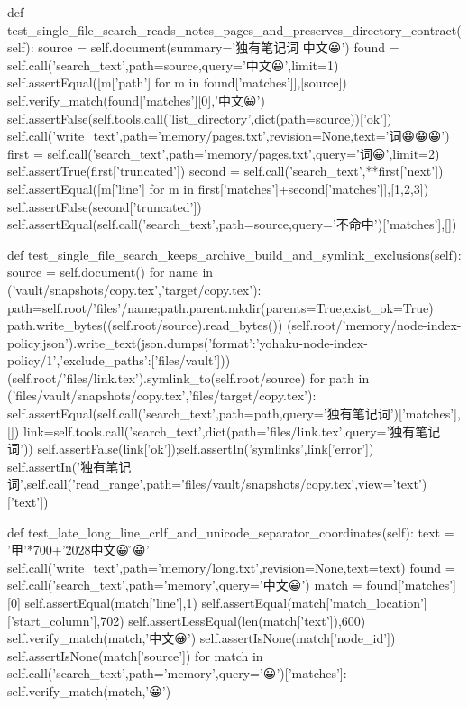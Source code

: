     def test_single_file_search_reads_notes_pages_and_preserves_directory_contract(self):
        source = self.document(summary='独有笔记词 中文😀')
        found = self.call('search_text',path=source,query='中文😀',limit=1)
        self.assertEqual([m['path'] for m in found['matches']],[source])
        self.verify_match(found['matches'][0],'中文😀')
        self.assertFalse(self.tools.call('list_directory',dict(path=source))['ok'])
        self.call('write_text',path='memory/pages.txt',revision=None,text='词😀😀😀\n')
        first = self.call('search_text',path='memory/pages.txt',query='词😀',limit=2)
        self.assertTrue(first['truncated'])
        second = self.call('search_text',**first['next'])
        self.assertEqual([m['line'] for m in first['matches']+second['matches']],[1,2,3])
        self.assertFalse(second['truncated'])
        self.assertEqual(self.call('search_text',path=source,query='不命中')['matches'],[])

    def test_single_file_search_keeps_archive_build_and_symlink_exclusions(self):
        source = self.document()
        for name in ('vault/snapshots/copy.tex','target/copy.tex'):
            path=self.root/'files'/name;path.parent.mkdir(parents=True,exist_ok=True)
            path.write_bytes((self.root/source).read_bytes())
        (self.root/'memory/node-index-policy.json').write_text(json.dumps({'format':'yohaku-node-index-policy/1','exclude_paths':['files/vault']}))
        (self.root/'files/link.tex').symlink_to(self.root/source)
        for path in ('files/vault/snapshots/copy.tex','files/target/copy.tex'):
            self.assertEqual(self.call('search_text',path=path,query='独有笔记词')['matches'],[])
        link=self.tools.call('search_text',dict(path='files/link.tex',query='独有笔记词'))
        self.assertFalse(link['ok']);self.assertIn('symlinks',link['error'])
        self.assertIn('独有笔记词',self.call('read_range',path='files/vault/snapshots/copy.tex',view='text')['text'])

    def test_late_long_line_crlf_and_unicode_separator_coordinates(self):
        text = '甲'*700+'\u2028中文😀尾\r{}😀\r\n'
        self.call('write_text',path='memory/long.txt',revision=None,text=text)
        found = self.call('search_text',path='memory',query='中文😀')
        match = found['matches'][0]
        self.assertEqual(match['line'],1)
        self.assertEqual(match['match_location']['start_column'],702)
        self.assertLessEqual(len(match['text']),600)
        self.verify_match(match,'中文😀')
        self.assertIsNone(match['node_id'])
        self.assertIsNone(match['source'])
        for match in self.call('search_text',path='memory',query='😀')['matches']:
            self.verify_match(match,'😀')

